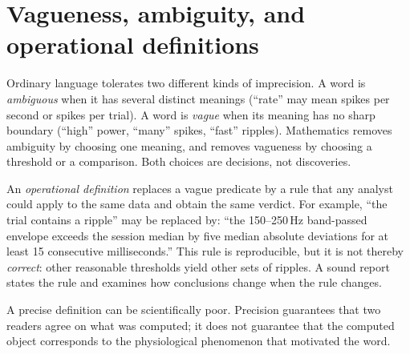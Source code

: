 \section{Vagueness, ambiguity, and operational definitions}
Ordinary language tolerates two different kinds of imprecision. A word is \emph{ambiguous} when it has several distinct meanings (``rate'' may mean spikes per second or spikes per trial). A word is \emph{vague} when its meaning has no sharp boundary (``high'' power, ``many'' spikes, ``fast'' ripples). Mathematics removes ambiguity by choosing one meaning, and removes vagueness by choosing a threshold or a comparison. Both choices are decisions, not discoveries.

An \emph{operational definition} replaces a vague predicate by a rule that any analyst could apply to the same data and obtain the same verdict. For example, ``the trial contains a ripple'' may be replaced by: ``the 150--250\,Hz band-passed envelope exceeds the session median by five median absolute deviations for at least 15 consecutive milliseconds.'' This rule is reproducible, but it is not thereby \emph{correct}: other reasonable thresholds yield other sets of ripples. A sound report states the rule and examines how conclusions change when the rule changes.

\begin{remark}
A precise definition can be scientifically poor. Precision guarantees that two readers agree on what was computed; it does not guarantee that the computed object corresponds to the physiological phenomenon that motivated the word.
\end{remark}

